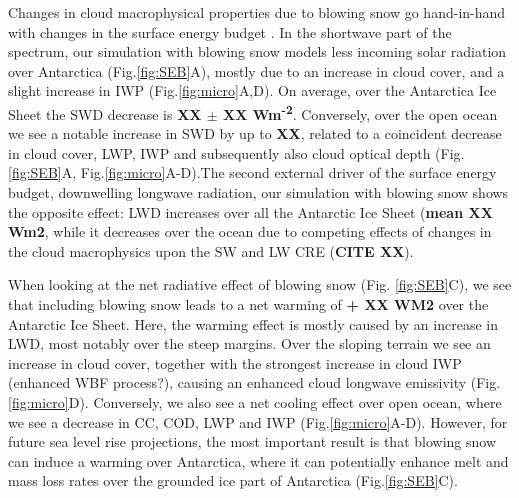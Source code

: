 \documentclass[12pt]{article}
\begin{document}
Changes in cloud macrophysical properties due to blowing snow go hand-in-hand with changes in the surface energy budget \cite{Hofer2019}. In the shortwave part of the spectrum, our simulation with blowing snow models less incoming solar radiation over Antarctica (Fig.\ref{fig:SEB}A), mostly due to an increase in cloud cover, and a slight increase in IWP (Fig.\ref{fig:micro}A,D). On average, over the Antarctica Ice Sheet the SWD decrease is \textbf{XX $\pm$ XX Wm\textsuperscript{-2}}. Conversely, over the open ocean we see a notable increase in SWD by up to \textbf{XX}, related to a coincident decrease in cloud cover, LWP, IWP and subsequently also cloud optical depth (Fig. \ref{fig:SEB}A, Fig.\ref{fig:micro}A-D).The second external driver of the surface energy budget, downwelling longwave radiation, our simulation with blowing snow shows the opposite effect: LWD increases over all the Antarctic Ice Sheet (\textbf{mean XX Wm2}, while it decreases over the ocean due to competing effects of changes in the cloud macrophysics upon the SW and LW CRE (\textbf{CITE XX}).

When looking at the net radiative effect of blowing snow (Fig. \ref{fig:SEB}C), we see that including blowing snow leads to a net warming of \textbf{+ XX WM2} over the Antarctic Ice Sheet. Here, the warming effect is mostly caused by an increase in LWD, most notably over the steep margins. Over the sloping terrain we see an increase in cloud cover, together with the strongest increase in cloud IWP (enhanced WBF process?), causing an enhanced cloud longwave emissivity (Fig. \ref{fig:micro}D). Conversely, we also see a net cooling effect over open ocean, where we see a decrease in CC, COD, LWP and IWP (Fig.\ref{fig:micro}A-D). However, for future sea level rise projections, the most important result is that blowing snow can induce a warming over Antarctica, where it can potentially enhance melt and mass loss rates over the grounded ice part of Antarctica (Fig.\ref{fig:SEB}C).
\end{document}
